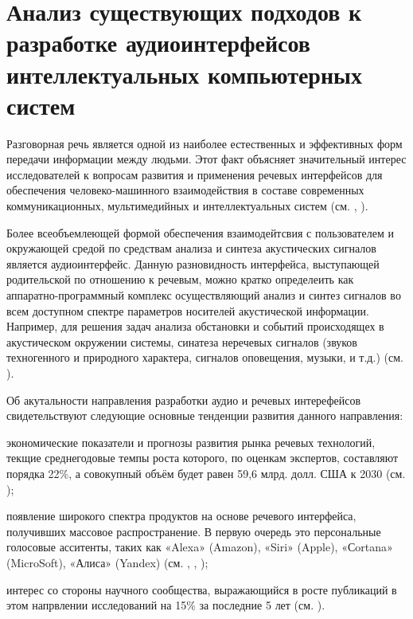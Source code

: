 \section{Анализ существующих подходов к разработке аудиоинтерфейсов интеллектуальных компьютерных систем}

Разговорная речь является одной из наиболее естественных и эффективных форм передачи информации между людьми. Этот факт объясняет значительный интерес исследователей к вопросам развития и применения речевых интерфейсов для обеспечения человеко-машинного взаимодействия в составе современных коммуникационных, мультимедийных и интеллектуальных систем (см. , ).

Более всеобъемлеющей формой обеспечения взаимодейтсвия с пользователем и окружающей средой по средствам анализа и синтеза акустических сигналов является аудиоинтерфейс. Данную разновидность интерфейса, выступающей родительской по отношению к речевым, можно кратко определеить как аппаратно-программный комплекс осуществляющий анализ и синтез сигналов во всем доступном спектре параметров носителей акустической информации. Например, для решения задач анализа обстановки и событий происходящех в акустическом окружении системы, синатеза неречевых сигналов (звуков техногенного и природного характера, сигналов оповещения, музыки, и т.д.) (см. ).

Об акутальности направления разработки аудио и речевых интерефейсов свидетельствуют следующие основные тенденции развития данного направления:
\begin{textitemize}    
    \item экономические показатели и прогнозы развития рынка речевых технологий, текщие среднегодовые темпы роста которого, по оценкам экспертов, составляют порядка 22\%, а совокупный объём будет равен 59,6 млрд. долл. США к 2030 (см. );
    \item появление широкого спектра продуктов на основе речевого интерфейса, получивших массовое распространение. В первую очередь это персональные голосовые асситенты, таких как  «Alexa» (Amazon), «Siri» (Apple), «Сortana» (MicroSoft), «Алиса» (Yandex) (см. , , );
    \item интерес со стороны научного сообщества, выражающийся в росте публикаций в этом напрвлении исследований на 15\% за последние 5 лет (см. ).
\end{textitemize}

